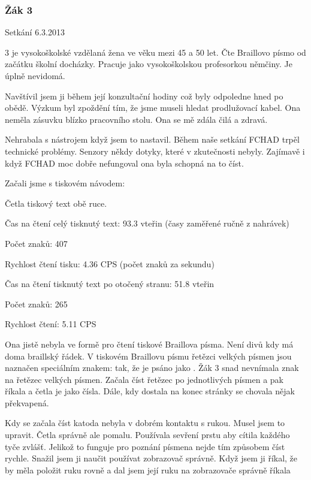 \subsubsection{Žák 3}

Setkání 6.3.2013

 3 je vysokoškolské vzdělaná žena ve věku mezi 45 a 50 let. Čte Braillovo písmo od začátku školní docházky.  Pracuje jako vysokoškolskou profesorkou němčiny.  Je úplně nevidomá.

Navštívil jsem ji během její konzultační hodiny což byly odpoledne hned po obědě.  Výzkum byl zpoždění tím, že jsme museli hledat prodlužovací kabel. Ona neměla zásuvku blízko pracovního stolu.  Ona se mě zdála čilá a zdravá.

Nehrabala s nástrojem když jsem to nastavil. Během naše setkání FCHAD trpěl technické problémy. Senzory někdy  dotyky, které v zkutečnosti nebyly.  Zajímavě i když FCHAD moc dobře nefungoval ona byla schopná na to číst.

Začali jsme s tiskovém návodem:

Četla tiskový text obě ruce.

Čas na čtení celý tisknutý text: 93.3 vteřin (časy zaměřené ručně z nahrávek)

Počet znaků: 407

Rychlost čtení tisku: 4.36 CPS (počet znaků za sekundu)

Čas na čtení tisknutý text po otočený stranu: 51.8 vteřin

Počet znaků: 265

Rychlost čtení: 5.11 CPS

Ona jistě nebyla ve formě pro čtení tiskové Braillova písma.  Není divů kdy má doma braillský řádek.  V tiskovém Braillovu písmu řetězci velkých písmen jsou naznačen speciálním znakem:  tak, že  je psáno jako . Žák 3 snad nevnímala znak na řetězec velkých písmen.  Začala číst řetězec po jednotlivých písmen a pak říkala  a četla je jako čísla.  Dále, kdy dostala na konec stránky se chovala nějak překvapená.

Kdy se začala číst katoda nebyla v dobrém kontaktu s rukou.  Musel jsem to upravit.  Četla správně ale pomalu. Používala sevření prstu aby cítila každého tyče zvlášť.  Jelikož to funguje pro poznání písmena nejde tím způsobem číst rychle. Snažil jsem ji naučit používat zobrazovač správně.  Když jsem ji říkal, že by měla položit ruku rovně a dal jsem její ruku na zobrazovače správně říkala  %

